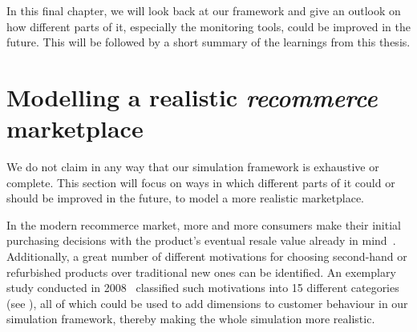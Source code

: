 \label{ch:Conclusions}

\begin{jointwork}
	In this final chapter, we will look back at our framework and give an outlook on how different parts of it, especially the monitoring tools, could be improved in the future. This will be followed by a short summary of the learnings from this thesis.
\end{jointwork}

\section{Modelling a realistic \emph{recommerce} marketplace}\label{sec:DivergingFromRealMarket}

We do not claim in any way that our simulation framework is exhaustive or complete. This section will focus on ways in which different parts of it could or should be improved in the future, to model a more realistic marketplace.


In the modern recommerce market, more and more consumers make their initial purchasing decisions with the product's eventual resale value already in mind~\cite{ShoppingResaleValue}. Additionally, a great number of different motivations for choosing second-hand or refurbished products over traditional new ones can be identified. An exemplary study conducted in 2008~\cite{SecondHandMotives} classified such motivations into 15 different categories (see ), all of which could be used to add dimensions to customer behaviour in our simulation framework, thereby making the whole simulation more realistic.

